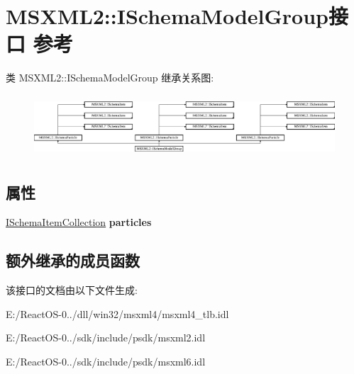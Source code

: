 \hypertarget{interface_m_s_x_m_l2_1_1_i_schema_model_group}{}\section{M\+S\+X\+M\+L2\+:\+:I\+Schema\+Model\+Group接口 参考}
\label{interface_m_s_x_m_l2_1_1_i_schema_model_group}
类 M\+S\+X\+M\+L2\+:\+:I\+Schema\+Model\+Group 继承关系图\+:\begin{figure}[H]
\begin{center}
\leavevmode
\includegraphics[height=2.368866cm]{interface_m_s_x_m_l2_1_1_i_schema_model_group}
\end{center}
\end{figure}
\subsection*{属性}
\begin{DoxyCompactItemize}
\item 
\mbox{\label{interface_m_s_x_m_l2_1_1_i_schema_model_group_a2e5f5411b2c97e3cd8c2777c22c314b8}} 
\hyperlink{interface_m_s_x_m_l2_1_1_i_schema_item_collection}{I\+Schema\+Item\+Collection} {\bfseries particles}
\end{DoxyCompactItemize}
\subsection*{额外继承的成员函数}


该接口的文档由以下文件生成\+:\begin{DoxyCompactItemize}
\item 
E\+:/\+React\+O\+S-\/0../dll/win32/msxml4/msxml4\+\_\+tlb.\+idl\item 
E\+:/\+React\+O\+S-\/0../sdk/include/psdk/msxml2.\+idl\item 
E\+:/\+React\+O\+S-\/0../sdk/include/psdk/msxml6.\+idl\end{DoxyCompactItemize}
